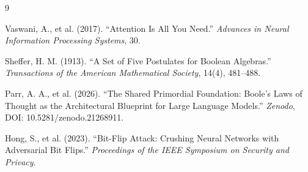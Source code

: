 \begin{thebibliography}{9}












Vaswani, A., et al. (2017). ``Attention Is All You Need.'' \emph{Advances in Neural Information Processing Systems}, 30.



















Sheffer, H. M. (1913). ``A Set of Five Postulates for Boolean Algebras.'' \emph{Transactions of the American Mathematical Society}, 14(4), 481--488.



















Parr, A. A., et al. (2026). ``The Shared Primordial Foundation: Boole's Laws of Thought as the Architectural Blueprint for Large Language Models.'' \emph{Zenodo}, DOI: 10.5281/zenodo.21268911.



















Hong, S., et al. (2023). ``Bit-Flip Attack: Crushing Neural Networks with Adversarial Bit Flips.'' \emph{Proceedings of the IEEE Symposium on Security and Privacy}.






\end{thebibliography}
